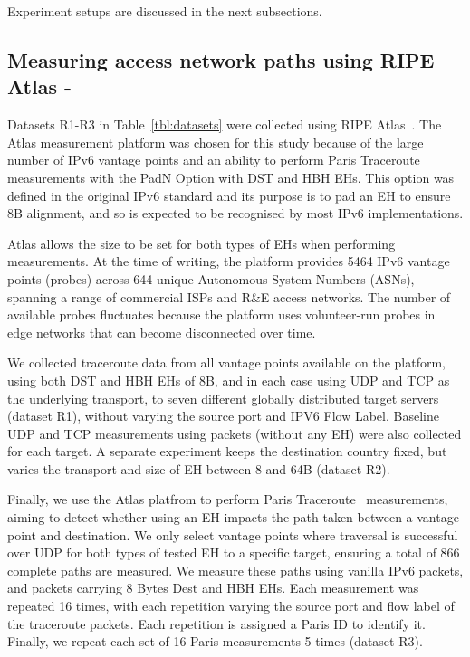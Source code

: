 \documentclass[conference]{IEEEtran}
\begin{document}
Experiment setups are discussed in the next subsections.

    \subsection{Measuring access network paths using RIPE Atlas - }
    \label{sec:ripe-methodology}

Datasets R1-R3 in Table~\ref{tbl:datasets} were collected using RIPE Atlas~\cite{bajpai2015lessons}.
The Atlas measurement platform was chosen for this study because of the large number of IPv6 vantage points and an ability to perform Paris Traceroute measurements with the PadN Option with DST and HBH EHs. This option was defined in the original IPv6 standard and its purpose is to pad an EH to ensure 8B alignment, and so is expected to be recognised by most IPv6 implementations.

Atlas allows the size to be set for both types of EHs when performing measurements. At the time of writing, the platform provides 5464 IPv6 vantage points (probes) across 644 unique Autonomous System Numbers (ASNs), spanning a range of commercial ISPs and R\&E access networks. The number of available probes fluctuates because the platform uses volunteer-run probes in edge networks that can become disconnected over time.

We collected traceroute data from all vantage points available on the platform, using both DST and HBH EHs of 8B, and in each case using UDP and TCP as the underlying transport, to seven different globally distributed target servers (dataset R1), without varying the source port and IPV6 Flow Label. Baseline UDP and TCP measurements using packets (without any EH) were also collected for each target.
A separate experiment keeps the destination country fixed, but varies the transport and size of EH between 8 and 64B (dataset R2).

Finally, we use the Atlas platfrom to perform Paris Traceroute~\cite{augustin2006avoiding} measurements, aiming to detect whether using an EH impacts the path taken between a vantage point and destination. We only select vantage points where traversal is successful over UDP for both types of tested EH to a specific target, ensuring a total of 866 complete paths are measured.
We measure these paths using vanilla IPv6 packets, and packets carrying 8 Bytes Dest and HBH EHs. Each measurement was repeated 16 times, with each repetition varying the source port and flow label of the traceroute packets. Each repetition is assigned a Paris ID to identify it. Finally, we repeat each set of 16 Paris measurements 5 times (dataset R3).
\end{document}
